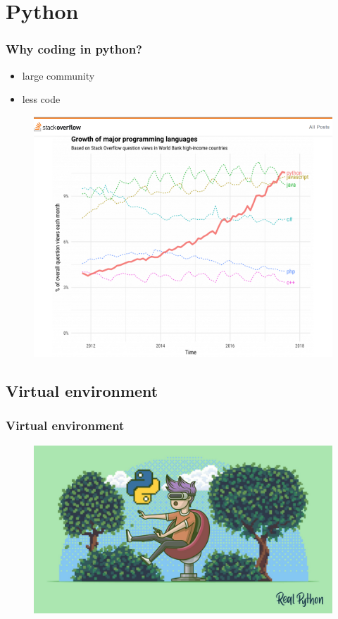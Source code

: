 \documentclass{beamer}
\begin{document}
\section{Python}
\begin{frame}
\frametitle{Why coding in python?}
\begin{itemize}
	\item large community
	\item less code
\end{itemize}
\begin{figure}
	\includegraphics[width=0.6\linewidth]{Pics/python_stack.png}
\end{figure}
\end{frame}

\subsection{Virtual environment}
\begin{frame}
	\frametitle{Virtual environment}
	\begin{figure}
		\includegraphics[width=\linewidth]{Pics/venv.jpg}
	\end{figure}
\end{frame}
\end{document}
